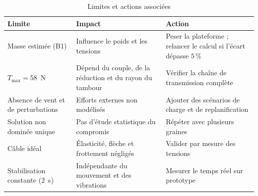 \begin{table}[H]
\centering
\caption{Limites et actions associées}
\label{tab:A7}
\footnotesize
\begin{tabular}{|p{3.8cm}|p{4.2cm}|p{4.5cm}|}
\hline
\textbf{Limite} & \textbf{Impact} & \textbf{Action} \\
\hline
Masse estimée (B1) & Influence le poids et les tensions & Peser la plateforme ; relancer le calcul si l'écart dépasse $5\,\%$ \\
\hline
$T_{\max} = 58$~N & Dépend du couple, de la réduction et du rayon du tambour & Vérifier la chaîne de transmission complète \\
\hline
Absence de vent et de perturbations & Efforts externes non modélisés & Ajouter des scénarios de charge et de replanification \\
\hline
Solution non dominée unique & Pas d'étude statistique du compromis & Répéter avec plusieurs graines \\
\hline
Câble idéal & Élasticité, flèche et frottement négligés & Valider par mesure des tensions \\
\hline
Stabilisation constante ($2$~s) & Indépendante du mouvement et des vibrations & Mesurer le temps réel sur prototype \\
\hline
\end{tabular}
\end{table}

